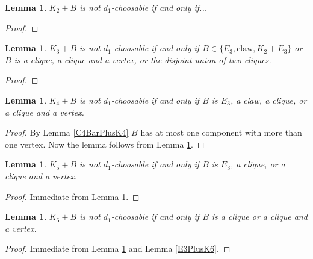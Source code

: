 \documentclass[12pt]{article}
\theoremstyle{plain}
\newtheorem{lem}[thm]{Lemma}
\theoremstyle{definition}
\theoremstyle{remark}
\begin{document}
\begin{lem}\label{K2Classification}
$K_2 + B$ is not $d_1$-choosable if and only if...
\end{lem}
\begin{proof}
\end{proof}

\begin{lem}\label{K3Classification}
$K_3 + B$ is not $d_1$-choosable if and only if $B \in \{E_3, \text{claw}, K_2 + E_3\}$ or $B$ is a clique, a clique and a vertex, or the disjoint union of two cliques.
\end{lem}
\begin{proof}
\end{proof}

\begin{lem}\label{K4Classification}
$K_4 + B$ is not $d_1$-choosable if and only if $B$ is $E_3$, a claw, a clique, or a clique and a vertex.
\end{lem}
\begin{proof}
By Lemma \ref{C4BarPlusK4} $B$ has at most one component with more than one vertex.  Now the lemma follows from Lemma \ref{K3Classification}.
\end{proof}

\begin{lem}\label{K5Classification}
$K_5 + B$ is not $d_1$-choosable if and only if $B$ is $E_3$, a clique, or a clique and a vertex.
\end{lem}
\begin{proof}
Immediate from Lemma \ref{K4Classification}.
\end{proof}

\begin{lem}\label{K6Classification}
$K_6 + B$ is not $d_1$-choosable if and only if $B$ is a clique or a clique and a vertex.
\end{lem}
\begin{proof}
Immediate from Lemma \ref{K5Classification} and Lemma \ref{E3PlusK6}.
\end{proof}



\end{document}
